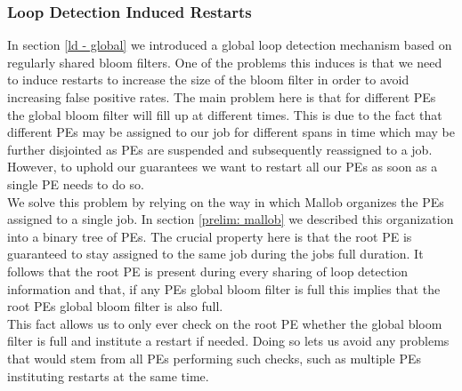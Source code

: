 \subsubsection{Loop Detection Induced Restarts}
In section \ref{ld - global} we introduced a global loop detection mechanism based on regularly shared bloom filters. One of the problems this induces is that we need to induce restarts to increase the size of the bloom filter in order to avoid increasing false positive rates. The main problem here is that for different PEs the global bloom filter will fill up at different times. This is due to the fact that different PEs may be assigned to our job for different spans in time which may be further disjointed as PEs are suspended and subsequently reassigned to a job. However, to uphold our guarantees we want to restart all our PEs as soon as a single PE needs to do so.\\
We solve this problem by relying on the way in which Mallob organizes the PEs assigned to a single job. In section \ref{prelim: mallob} we described this organization into a binary tree of PEs. The crucial property here is that the root PE is guaranteed to stay assigned to the same job during the jobs full duration. It follows that the root PE is present during every sharing of loop detection information and that, if any PEs global bloom filter is full this implies that the root PEs global bloom filter is also full. \\
This fact allows us to only ever check on the root PE whether the global bloom filter is full and institute a restart if needed. Doing so lets us avoid any problems that would stem from all PEs performing such checks, such as multiple PEs instituting restarts at the same time.
